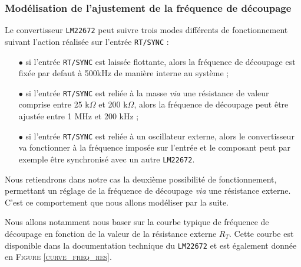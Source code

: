 			\subsubsection{Modélisation de l'ajustement de la fréquence de découpage}
			
			Le convertisseur \texttt{LM22672} peut suivre trois modes différents
			de fonctionnement suivant l'action réalisée sur l'entrée 
			\texttt{RT/SYNC} :
			\begin{itemize}
				\item[$\bullet$]si l'entrée \texttt{RT/SYNC} est laissée flottante,
								alors la fréquence de découpage est fixée par
								defaut à 500kHz de manière interne au système ;
				\item[$\bullet$]si l'entrée \texttt{RT/SYNC} est reliée à la masse
								\textit{via} une résistance de valeur comprise entre 
								25 k$\Omega$ et 200 k$\Omega$, alors la fréquence de découpage
								peut être ajustée entre 1 MHz et 200 kHz ;
				\item[$\bullet$]si l'entrée \texttt{RT/SYNC} est reliée à un oscillateur
								externe, alors le convertisseur va fonctionner à la fréquence
								imposée sur l'entrée et le composant peut par exemple être
								synchronisé avec un autre \texttt{LM22672}.
			\end{itemize}
			
			Nous retiendrons dans notre cas la deuxième possibilité de 
			fonctionnement, permettant un réglage de la fréquence de découpage
			\textit{via} une résistance externe. C'est ce comportement que nous
			allons modéliser par la suite. 
			
			Nous allons notamment nous baser
			sur la courbe typique de fréquence de découpage en fonction de la
			valeur de la résistance externe $R_T$. Cette courbe est disponible
			dans la documentation technique du \texttt{LM22672} \cite{LM22672}
			et est également donnée en \textsc{Figure \ref{curve_freq_res}}.
			
